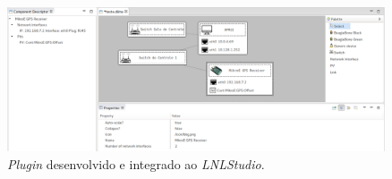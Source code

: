 \begin{figure}[h]

\centering
\includegraphics[width=0.995\textwidth]{image/plugin}
\caption {\textit{Plugin} desenvolvido e integrado ao \textit{LNLStudio}.}
\label{fig:plugin}
\end{figure}
 